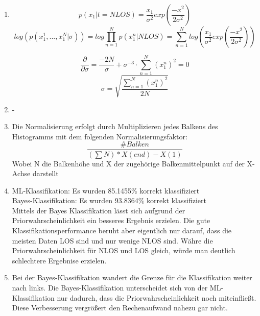 \begin{enumerate}
 \item 

\begin{equation}
 p(x_1|t=NLOS) = \frac{x_1}{\sigma^2} exp(\frac{-x^2}{2\sigma^2})
\end{equation}
\begin{equation}
 log(p(x_1^1, ..., x_1^N| \sigma)) = log \prod_{n=1}^N p(x_1^n|NLOS) = \sum_{n=1}^N log(\frac{x_1}{\sigma^2} exp(\frac{-x^2}{2\sigma^2}))
\end{equation}

\begin{equation}
\frac{\partial}{\partial \sigma} = \frac{-2N}{\sigma} + \sigma^{-3} \cdot \sum_{n=1}^N (x_1^n)^2 = 0
\end{equation}
\begin{equation}
 \sigma = \sqrt{\frac{\sum_{n=1}^N (x_1^n)^2}{2N}}
\end{equation}


\item -
\item Die Normalisierung erfolgt durch Multiplizieren jedes Balkens des Histogramms mit dem folgenden Normalisierungsfaktor:
\begin{equation}
 \frac{\#Balken}{(\sum N) * X(end) - X(1)}
\end{equation}
Wobei N die Balkenhöhe und X der zugehörige Balkenmittelpunkt auf der X-Achse darstellt
\item 
ML-Klassifikation: Es wurden 85.1455\% korrekt klassifiziert \\
Bayes-Klassifikation: Es wurden 93.8364\% korrekt klassifiziert \\
Mittels der Bayes Klassifikation lässt sich aufgrund der Priorwahrscheinlichkeit ein besseres Ergebnis erzielen.
Die gute Klassifikationsperformance beruht aber eigentlich nur darauf, dass die meisten Daten LOS sind und nur
wenige NLOS sind. Währe die Priorwahrscheinlichkeit für NLOS und LOS gleich, würde man deutlich schlechtere Ergebnise
erzielen.
\item Bei der Bayes-Klassifikation wandert die Grenze für die Klassifikation weiter nach links. 
Die Bayes-Klassifikation unterscheidet sich von der ML-Klassifikation nur dadurch, dass die Priorwahrscheinlichkeit
noch miteinfließt. Diese Verbesserung vergrößert den Rechenaufwand nahezu gar nicht.




\end{enumerate}

